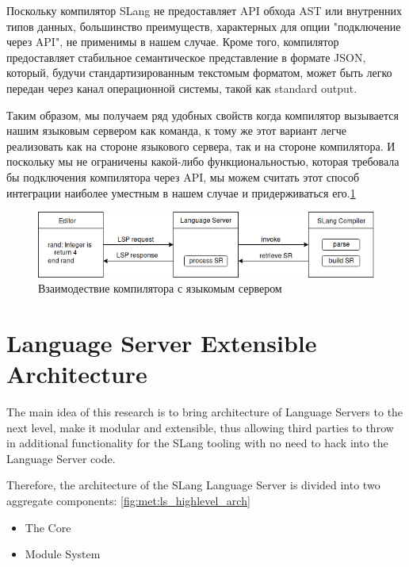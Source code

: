 Поскольку компилятор SLang\cite{Zouev2017} не предоставляет API обхода AST или внутренних типов данных, большинство преимуществ, 
характерных для опции "подключение через API", не применимы в нашем случае. 
Кроме того, компилятор предоставляет стабильное семантическое представление в формате JSON, который, 
будучи стандартизированным текстомым форматом, может быть легко передан через канал операционной системы, такой как standard output\cite{TheOpenGroup1997}.

Таким образом, мы получаем ряд удобных свойств когда компилятор вызывается нашим языковым сервером как команда, к тому же
этот вариант легче реализовать как на стороне языкового сервера, так и на стороне компилятора. 
И поскольку мы не ограничены какой-либо функциональностью, которая требовала бы подключения компилятора через API, 
мы можем считать этот способ интеграции наиболее уместным в нашем случае и придерживаться его.\ref{fig:met:compiler_integration}
\begin{figure}[H]
    \centering
    \includegraphics[width=1.0\textwidth]{figs/compiler_integration.png}
    \caption{Взаимодествие компилятора с языкомым сервером}
    \label{fig:met:compiler_integration}
\end{figure}

\section{Language Server Extensible Architecture}
\label{sec:met:arch}
The main idea of this research is to bring architecture of Language Servers to the next level,
make it modular and extensible, thus allowing third parties to throw in additional functionality for the SLang tooling
with no need to hack into the Language Server code.

Therefore, the architecture of the SLang Language Server is divided into two aggregate components: \ref{fig:met:ls_highlevel_arch}
\begin{itemize}
    \item The Core
    \item Module System
\end{itemize}

